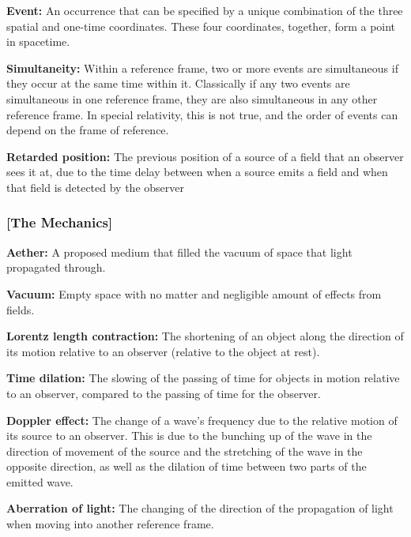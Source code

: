 \noindent \hypertarget{def-event}{\textbf{Event:}}
An occurrence that can be specified by a unique combination of the three spatial and one-time coordinates. These four coordinates, together, form a point in spacetime.

\noindent \hypertarget{def-simultaneity}{\textbf{Simultaneity:}}
Within a reference frame, two or more events are simultaneous if they occur at the same time within it. Classically if any two events are simultaneous in one reference frame, they are also simultaneous in any other reference frame. In special relativity, this is not true, and the order of events can depend on the frame of reference.

\noindent \hypertarget{def-retarded-position}{\textbf{Retarded position:}}
The previous position of a source of a field that an observer sees it at, due to the time delay between when a source emits a field and when that field is detected by the observer


\subsubsection{[The Mechanics]}%

\noindent \hypertarget{def-aether}{\textbf{Aether:}}
A proposed medium that filled the vacuum of space that light propagated through.

\noindent \hypertarget{def-vacuum}{\textbf{Vacuum:}}
Empty space with no matter and negligible amount of effects from fields.

\noindent \hypertarget{def-length-contraction}{\textbf{Lorentz length contraction:}}
The shortening of an object along the direction of its motion relative to an observer (relative to the object at rest).

\noindent \hypertarget{def-time-dilation}{\textbf{Time dilation:}}
The slowing of the passing of time for objects in motion relative to an observer, compared to the passing of time for the observer.

\noindent \hypertarget{def-doppler-effect}{\textbf{Doppler effect:}}
The change of a wave's frequency due to the relative motion of its source to an observer. This is due to the bunching up of the wave in the direction of movement of the source and the stretching of the wave in the opposite direction, as well as the dilation of time between two parts of the emitted wave.

\noindent \hypertarget{def-aberration}{\textbf{Aberration of light:}}
The changing of the direction of the propagation of light when moving into another reference frame.

